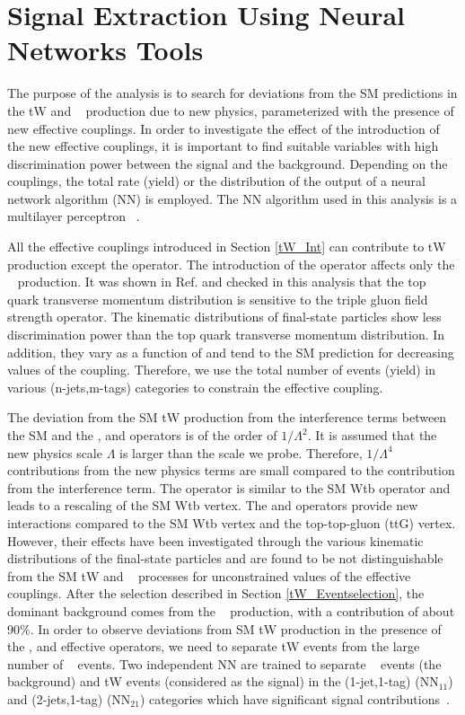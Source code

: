 \clearpage
\section{Signal Extraction Using Neural Networks Tools}
\label{signal}
The purpose of the analysis is to search for deviations from the SM predictions in the tW and \ttbar~ production due to new physics, parameterized with the presence of new effective couplings. In order to investigate the effect of the introduction of the new effective couplings,
it is important to find suitable variables with high discrimination power between the signal and the  background.
Depending on the couplings, the total rate (yield) or the distribution of the output of a neural network algorithm (NN) is employed.
The NN algorithm used in this analysis is a multilayer perceptron ~\cite{Denby:1992jd}.


All the effective couplings introduced in Section \ref{tW_Int} can contribute to  tW production except the \OG operator.
The introduction of the \OG operator affects only the \ttbar~ production. It was shown in Ref. \cite{Cho:1994yu} and checked in this analysis that the top quark transverse momentum distribution is sensitive to the triple gluon field strength operator.
The kinematic distributions of final-state particles show less discrimination power than the  top quark transverse momentum distribution. In addition,  they vary as a function of \CG and tend to the SM prediction for decreasing values of the \CG coupling. Therefore, we use the total number of events (yield) in  various (n-jets,m-tags) categories to constrain the \CG effective coupling.

The deviation from the SM tW production from the interference terms between the
SM and the \OtG, \Ophiq and \OtW operators is of the order of $1/\Lambda^2$.
It is assumed that the new physics scale $\Lambda$ is larger than the scale we probe. Therefore, $1/\Lambda^4$
contributions from the new physics terms are small compared to the contribution from the interference term.
The operator \Ophiq is similar to the SM Wtb operator and leads to a rescaling of the SM Wtb vertex.
The \OtW and \OtG operators provide new interactions compared to the SM Wtb vertex and the top-top-gluon (ttG) vertex.
However, their effects have been investigated through the various kinematic distributions of the final-state particles and are found to be not distinguishable from the SM tW and \ttbar~ processes for unconstrained values of the effective couplings.
After the selection described in Section \ref{tW_Eventselection}, the dominant background comes from the \ttbar~ production, with a contribution of about 90\%.
In order to observe deviations from SM tW production in the presence of the \Ophiq, \OtW and \OtG effective operators, we need to separate tW events from the large number of \ttbar~ events.
 Two independent NN are trained to separate \ttbar~ events (the background) and tW events (considered as the signal) in the (1-jet,1-tag) (NN$_{11}$) and (2-jets,1-tag) (NN$_{21}$) categories which have significant signal contributions~\cite{Sirunyan:2018lcp}.




